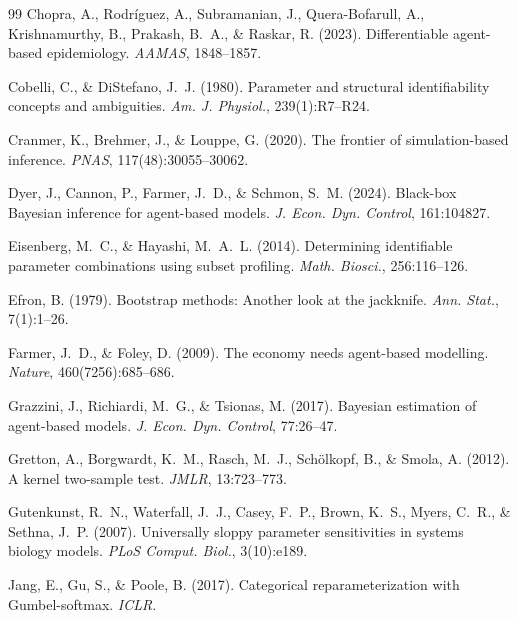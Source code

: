 \documentclass[10pt,twocolumn]{article}
\begin{document}
{\begin{thebibliography}{99}
Chopra, A., Rodr\'iguez, A., Subramanian, J., Quera-Bofarull, A., Krishnamurthy, B.,
Prakash, B.~A., \& Raskar, R. (2023). Differentiable agent-based epidemiology.
\textit{AAMAS}, 1848--1857.

Cobelli, C., \& DiStefano, J.~J. (1980). Parameter and structural identifiability
concepts and ambiguities. \textit{Am. J. Physiol.}, 239(1):R7--R24.

Cranmer, K., Brehmer, J., \& Louppe, G. (2020). The frontier of simulation-based
inference. \textit{PNAS}, 117(48):30055--30062.

Dyer, J., Cannon, P., Farmer, J.~D., \& Schmon, S.~M. (2024). Black-box Bayesian
inference for agent-based models. \textit{J. Econ. Dyn. Control}, 161:104827.

Eisenberg, M.~C., \& Hayashi, M.~A.~L. (2014). Determining identifiable parameter
combinations using subset profiling. \textit{Math. Biosci.}, 256:116--126.

Efron, B. (1979). Bootstrap methods: Another look at the jackknife.
\textit{Ann. Stat.}, 7(1):1--26.

Farmer, J.~D., \& Foley, D. (2009). The economy needs agent-based modelling.
\textit{Nature}, 460(7256):685--686.

Grazzini, J., Richiardi, M.~G., \& Tsionas, M. (2017). Bayesian estimation of
agent-based models. \textit{J. Econ. Dyn. Control}, 77:26--47.

Gretton, A., Borgwardt, K.~M., Rasch, M.~J., Sch\"olkopf, B., \& Smola, A. (2012).
A kernel two-sample test. \textit{JMLR}, 13:723--773.

Gutenkunst, R.~N., Waterfall, J.~J., Casey, F.~P., Brown, K.~S., Myers, C.~R., \&
Sethna, J.~P. (2007). Universally sloppy parameter sensitivities in systems biology
models. \textit{PLoS Comput. Biol.}, 3(10):e189.

Jang, E., Gu, S., \& Poole, B. (2017). Categorical reparameterization with
Gumbel-softmax. \textit{ICLR}.


\end{thebibliography}}
\end{document}
